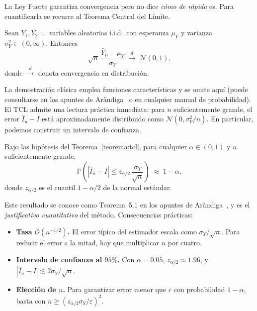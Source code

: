La Ley Fuerte garantiza convergencia pero no dice \emph{cómo de rápida} es. Para cuantificarla se recurre al Teorema Central del Límite.

\begin{teorema}
\label{teorema:tcl}
Sean $Y_1, Y_2, \ldots$ variables aleatorias i.i.d.\ con esperanza $\mu_Y$ y varianza $\sigma_Y^2 \in (0, \infty)$. Entonces
\[
    \sqrt{n}\,\frac{\bar{Y}_n - \mu_Y}{\sigma_Y} \;\xrightarrow{d}\; \mathcal{N}(0, 1),
\]
donde $\xrightarrow{d}$ denota convergencia en distribución.
\end{teorema}

La demostración clásica emplea funciones características y se omite aquí (puede consultarse en los apuntes de Aràndiga~\cite{arandiga} o en cualquier manual de probabilidad). El TCL admite una lectura práctica inmediata: para $n$ suficientemente grande, el error $\widehat{I}_n - I$ está aproximadamente distribuido como $\mathcal{N}(0, \sigma_Y^2/n)$. En particular, podemos construir un intervalo de confianza.

\begin{teorema}
\label{teorema:error-mc}
Bajo las hipótesis del Teorema~\ref{teorema:tcl}, para cualquier $\alpha \in (0,1)$ y $n$ suficientemente grande,
\begin{equation}
    \mathbb{P}\!\left(\left|\widehat{I}_n - I\right| \leq z_{\alpha/2}\,\frac{\sigma_Y}{\sqrt{n}}\right) \;\approx\; 1 - \alpha,
    \label{eq:cota-error-mc}
\end{equation}
donde $z_{\alpha/2}$ es el cuantil $1-\alpha/2$ de la normal estándar.
\end{teorema}

Este resultado se conoce como Teorema~5.1 en los apuntes de Aràndiga~\cite{arandiga}, y es el \emph{justificativo cuantitativo} del método. Consecuencias prácticas:

\begin{itemize}
    \item \textbf{Tasa $\mathcal{O}(n^{-1/2})$.} El error típico del estimador escala como $\sigma_Y / \sqrt{n}$. Para reducir el error a la mitad, hay que multiplicar $n$ por cuatro.
    \item \textbf{Intervalo de confianza al $95\%$.} Con $\alpha = 0.05$, $z_{\alpha/2} \approx 1.96$, y $|\widehat{I}_n - I| \lesssim 2\sigma_Y / \sqrt{n}$.
    \item \textbf{Elección de $n$.} Para garantizar error menor que $\varepsilon$ con probabilidad $1-\alpha$, basta con $n \geq (z_{\alpha/2}\sigma_Y/\varepsilon)^2$.
\end{itemize}

